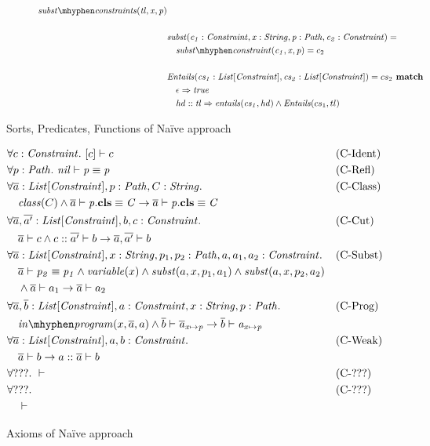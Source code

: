 \begin{figure}[t]
\begin{subfigure}[c]{1\textwidth}
\begin{align*}
{  \substconstrs{tl}{x}{p}}\\\\
&\mathit{subst(c_1: Constraint, x: String, p: Path, c_2: Constraint)} = \\
&\quad\substconstr{c_1}{x}{p} = c_2 \\\\
&\mathit{Entails(cs_1: List[Constraint], cs_2: List[Constraint])} = cs_2 \match\\
&\quad \case{\epsilon}{true}\\
&\quad \case{hd :: tl}{\mIt{entails}(cs_1, hd)} \land \mIt{Entails}(cs_1, tl)
\end{align*}
\label{subfig:axioms-naive-general-funs}
\end{subfigure}
\caption{Sorts, Predicates, Functions of Na\"ive approach}
\label{fig:axioms-naive-general}
\end{figure}

\begin{figure} %
\begin{align*}
&\forall c: \Constr.\ \entails{[c]}{c} && \text{(C-Ident)} \\
&\forall p: \Path.\ \entails{\nil}{\pathEq{p}{p}} && \text{(C-Refl)} \\
&\forall \ovl{a}: \Constrs, p: \Path, C: \String.&& \text{(C-Class)} \\
&\quad \mIt{class}(C) \land \entails{\ovl{a}}{\instBy{p}{C}}
       \rightarrow \entails{\ovl{a}}{\instBy{p}{C}} \\
&\forall \ovl{a}, \ovl{a'}: \Constrs, b, c: \Constr. && \text{(C-Cut)} \\
&\quad \entails{\ovl a}{c} \land \entails{c :: \ovl{a'}}{b}
       \rightarrow \entails{\ovl a, \ovl{a'}}{b}\\
&\forall \ovl a: \Constrs, x: \String, p_1, p_2: \Path, a, a_1, a_2: \Constr. && \text{(C-Subst)} \\
&\quad \entails{\ovl a}{\pathEq{p_2}{p_1}} \land \mIt{variable}(x)
         \land \mIt{subst}(a, x, p_1, a_1) \land \mIt{subst}(a, x, p_2, a_2)\\
&\quad   \land \entails{\ovl a}{a_1}
       \rightarrow \entails{\ovl a}{a_2} \\
&\forall \ovl a, \ovl b: \Constrs, a: \Constr, x: \String, p: \Path. && \text{(C-Prog)} \\
&\quad \inprog(x, \ovl a, a) \land \entails{\ovl b}{\subst{\ovl a}{x}{p}}
       \rightarrow \entails{\ovl b}{\subst{a}{x}{p}} \\
&\forall \ovl a: \Constrs, a, b: \Constr. && \text{(C-Weak)} \\
&\quad \entails{\ovl a}{b}
       \rightarrow \entails{a :: \ovl a}{b}\\
&\forall ???.\ \entails{}{} && \text{(C-???)}\\
&\forall ???. && \text{(C-???)} \\
&\quad \entails{}{}
\end{align*}
\caption{Axioms of Na\"ive approach}
\label{fig:axioms-naive}
\end{figure}

